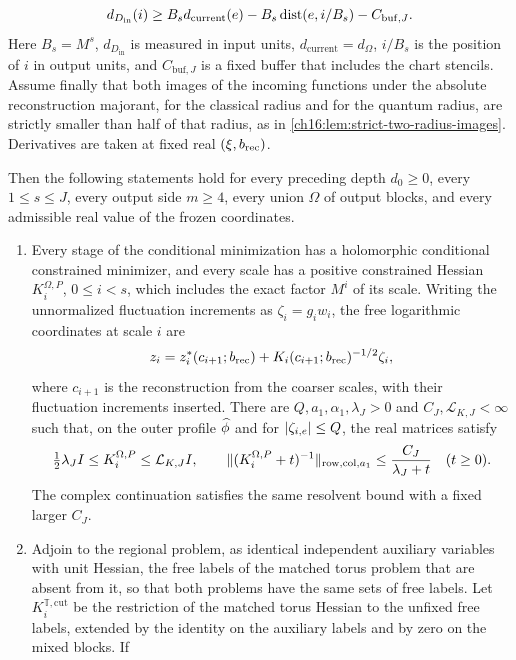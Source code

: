 \begin{theorem}
\begin{equation}\label{ch17:eq:incoming-wall-gate}
 d_{D_{\mathrm{in}}}(i)\ge B_sd_{\mathrm{current}}(e)-B_s\operatorname{dist}(e,i/B_s)-C_{\mathrm{buf},J}.
\end{equation}
Here $B_s=M^s$, $d_{D_{\mathrm{in}}}$ is measured in input units, $d_{\mathrm{current}}=d_\Omega$, $i/B_s$ is the position of $i$ in output units, and $C_{\mathrm{buf},J}$ is a fixed buffer that includes the chart stencils. Assume finally that both images of the incoming functions under the absolute reconstruction majorant, for the classical radius and for the quantum radius, are strictly smaller than half of that radius, as in \cref{ch16:lem:strict-two-radius-images}. Derivatives are taken at fixed real $(\xi,b_{\mathrm{rec}})$.

Then the following statements hold for every preceding depth $d_0\ge0$, every $1\le s\le J$, every output side $m\ge4$, every union $\Omega$ of output blocks, and every admissible real value of the frozen coordinates.
\begin{enumerate}
\item Every stage of the conditional minimization has a holomorphic conditional constrained minimizer, and every scale has a positive constrained Hessian $K_i^{\Omega,P}$, $0\le i<s$, which includes the exact factor $M^i$ of its scale. Writing the unnormalized fluctuation increments as $\zeta_i=g_iw_i$, the free logarithmic coordinates at scale $i$ are
\[
 z_i=z_i^*(c_{i+1};b_{\mathrm{rec}})+K_i(c_{i+1};b_{\mathrm{rec}})^{-1/2}\zeta_i,
\]
where $c_{i+1}$ is the reconstruction from the coarser scales, with their fluctuation increments inserted. There are $Q,a_1,\alpha_1,\lambda_J>0$ and $C_J,\mathcal L_{K,J}<\infty$ such that, on the outer profile $\widehat\phi$ and for $\lvert \zeta_{i,e}\rvert\le Q$, the real matrices satisfy
\begin{equation}\label{ch17:eq:hessian-bounds}
 \tfrac12\lambda_JI\le K_i^{\Omega,P}\le\mathcal L_{K,J}I,\qquad
 \lVert (K_i^{\Omega,P}+t)^{-1}\rVert_{\mathrm{row,col},a_1}\le\frac{C_J}{\lambda_J+t}\quad(t\ge0).
\end{equation}
The complex continuation satisfies the same resolvent bound with a fixed larger $C_J$.
\item Adjoin to the regional problem, as identical independent auxiliary variables with unit Hessian, the free labels of the matched torus problem that are absent from it, so that both problems have the same sets of free labels. Let $K_i^{\mathbb T,\mathrm{cut}}$ be the restriction of the matched torus Hessian to the unfixed free labels, extended by the identity on the auxiliary labels and by zero on the mixed blocks. If

\end{enumerate}
\end{theorem}
